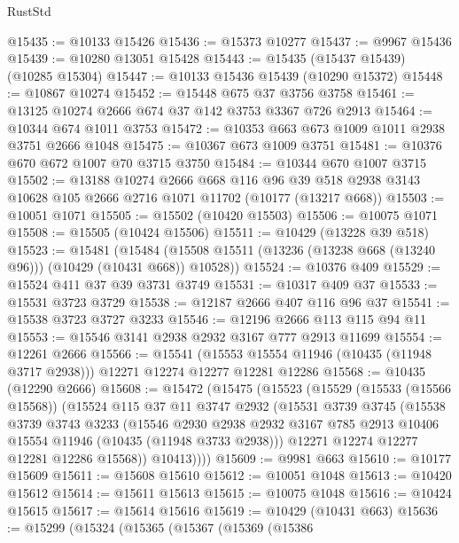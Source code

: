 \begin{lexlean}{RustStd}
\begin{coremodule}
{\begin{coremodule}
{{{{{{{{{{{{{{{{{{{{{{{{{{{{{{{{{{{{{{{{{{{{{{{{{{{{{{{{{{{{{{{{{{{{{{{{{{{{{{@15435 := @10133 @15426
@15436 := @15373 @10277
@15437 := @9967 @15436
@15439 := @10280 @13051 @15428
@15443 := @15435 (@15437 @15439) (@10285 @15304)
@15447 := @10133 @15436 @15439 (@10290 @15372)
@15448 := @10867 @10274
@15452 := @15448 @675 @37 @3756 @3758
@15461 := @13125 @10274 @2666 @674 @37 @142 @3753 @3367 @726 @2913
@15464 := @10344 @674 @1011 @3753
@15472 := @10353 @663 @673 @1009 @1011 @2938 @3751 @2666 @1048
@15475 := @10367 @673 @1009 @3751
@15481 := @10376 @670 @672 @1007 @70 @3715 @3750
@15484 := @10344 @670 @1007 @3715
@15502 := @13188
    @10274
    @2666
    @668
    @116
    @96
    @39
    @518
    @2938
    @3143
    @10628
    @105
    @2666
    @2716
    @1071
    @11702
    (@10177 (@13217 @668))
@15503 := @10051 @1071
@15505 := @15502 (@10420 @15503)
@15506 := @10075 @1071
@15508 := @15505 (@10424 @15506)
@15511 := @10429 (@13228 @39 @518)
@15523 := @15481
    (@15484 (@15508 @15511 (@13236 (@13238 @668 (@13240 @96))) (@10429 (@10431 @668)) @10528))
@15524 := @10376 @409
@15529 := @15524 @411 @37 @39 @3731 @3749
@15531 := @10317 @409 @37
@15533 := @15531 @3723 @3729
@15538 := @12187 @2666 @407 @116 @96 @37
@15541 := @15538 @3723 @3727 @3233
@15546 := @12196 @2666 @113 @115 @94 @11
@15553 := @15546 @3141 @2938 @2932 @3167 @777 @2913 @11699
@15554 := @12261 @2666
@15566 := @15541
    (@15553 @15554 @11946 (@10435 (@11948 @3717 @2938)))
    @12271
    @12274
    @12277
    @12281
    @12286
@15568 := @10435 (@12290 @2666)
@15608 := @15472
    (@15475
      (@15523
        (@15529
          (@15533 (@15566 @15568))
          (@15524
            @115
            @37
            @11
            @3747
            @2932
            (@15531
              @3739
              @3745
              (@15538
                @3739
                @3743
                @3233
                (@15546
                  @2930
                  @2938
                  @2932
                  @3167
                  @785
                  @2913
                  @10406
                  @15554
                  @11946
                  (@10435 (@11948 @3733 @2938)))
                @12271
                @12274
                @12277
                @12281
                @12286
                @15568))
            @10413))))
@15609 := @9981 @663
@15610 := @10177 @15609
@15611 := @15608 @15610
@15612 := @10051 @1048
@15613 := @10420 @15612
@15614 := @15611 @15613
@15615 := @10075 @1048
@15616 := @10424 @15615
@15617 := @15614 @15616
@15619 := @10429 (@10431 @663)
@15636 := @15299
    (@15324
      (@15365
        (@15367
          (@15369
            (@15386
}}}}}}}}}}}}}}}}}}}}}}}}}}}}}}}}}}}}}}}}}}}}}}}}}}}}}}}}}}}}}}}}}}}}}}}}}}}}}}
\end{coremodule}}
\end{coremodule}
\end{lexlean}
